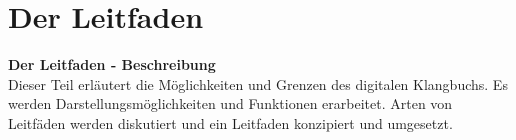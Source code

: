 
\newcommand{\fFunktionen}{040_funktionen}

\part{Der Leitfaden}

\textbf{Der Leitfaden - Beschreibung}\\
Dieser Teil erläutert die Möglichkeiten und Grenzen des digitalen Klangbuchs. Es werden Darstellungsmöglichkeiten und Funktionen erarbeitet. Arten von Leitfäden werden diskutiert und ein Leitfaden konzipiert und umgesetzt.






